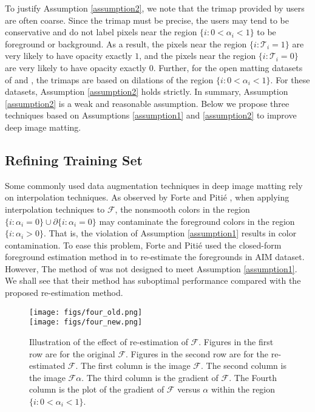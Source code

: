\documentclass{article}
\theoremstyle{plain}
\begin{document}
To justify Assumption \ref{assumption2},
we note that the trimap provided by users are often coarse.
Since the trimap must be precise, the users may tend to be conservative and do not label pixels near the region $\{ i: 0< \alpha_i < 1 \}$ to be foreground or background.
As a result, the pixels near the region $\{i: \mathcal T_i =1\}$ are very likely to have opacity exactly $1$, and the pixels near the region $\{i: \mathcal T_i = 0\}$ are very likely to have opacity exactly $0$.
Further, 
for the open matting datasets
of \cite{Rhemann2009APerceptually} and \cite{Xu2017DeepImageMatting},
the trimaps are based on dilations of the region
$\{ i: 0< \alpha_i < 1 \}$.
For these datasets, Assumption \ref{assumption2} holds strictly.
In summary, Assumption \ref{assumption2} is a weak and  reasonable assumption.
 Below we propose three techniques based on Assumptions \ref{assumption1} and \ref{assumption2} to improve deep image matting.


\subsection{Refining Training Set}
Some commonly used data augmentation techniques in deep image matting rely on interpolation techniques.
As observed by Forte and Piti\'e \cite{Forte2020FBA},
when applying interpolation techniques to $\mathcal F$,
the nonsmooth colors in the region $\{i:\alpha_i = 0\} \cup \partial \{i : \alpha_i = 0 \}$ may contaminate the foreground colors in the region $\{i:\alpha_i > 0\}$.
That is, the violation of Assumption \ref{assumption1} results in color contamination.
To ease this problem,
Forte and  Piti\'e \cite{Forte2020FBA} used the closed-form foreground estimation method in \cite{Levin2008AClosed-Form} to re-estimate the foregrounds in AIM dataset.
However, The method of \cite{Levin2008AClosed-Form} was not designed to meet Assumption \ref{assumption1}.
We shall see that their method has suboptimal performance compared with the proposed re-estimation method.



\begin{figure*}[t]
  \centering
  \texttt{[image: figs/four\_old.png]}
  \\
  \texttt{[image: figs/four\_new.png]}
  \caption{Illustration of the effect of re-estimation of $\mathcal F$. 
      Figures in the first row are for the original $\mathcal F$.
      Figures in the second row are for the re-estimated $\mathcal F$.
      The first column is the image $\mathcal F$.
      The second column is the image $\mathcal F \alpha$.
      The third column is the gradient of $\mathcal F$.
      The Fourth column is the plot of the gradient of $\mathcal F$ versus $\alpha$ within the region $\{i: 0 < \alpha_i < 1\}$.
  }
  \label{fig:four_and_four}
\end{figure*}
\end{document}
